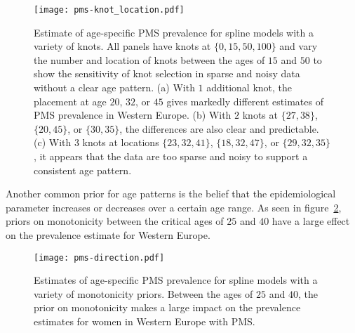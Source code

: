     \begin{figure}
        \begin{center}
            \texttt{[image: pms-knot\_location.pdf]}
        \end{center}
        \caption[Estimate of age-specific PMS prevalence for spline
          models with a variety of knots]{Estimate of age-specific PMS
          prevalence for spline models with a variety of knots.  All
          panels have knots at $\{0, 15, 50, 100\}$ and vary the number
          and location of knots between the ages of $15$ and $50$ to show
          the sensitivity of knot selection in sparse and noisy data
          without a clear age pattern. (a) With $1$ additional knot, the
          placement at age $20$, $32$, or $45$ gives markedly different
          estimates of PMS prevalence in Western Europe.  (b) With $2$
          knots at $\{27, 38\}$, $\{20, 45\}$, or $\{30, 35\}$, the
          differences are also clear and predictable. (c) With $3$ knots
          at locations $\{23, 32, 41\}$, $\{18, 32, 47\}$, or $\{29, 32,
          35\}$, it appears that the data are too sparse and noisy to
          support a consistent age pattern.}
        \label{fig:app-pms knot_loc}
    \end{figure}

Another common prior for age patterns is the belief that the
epidemiological parameter increases or decreases over a certain age
range.  As seen in figure~\ref{fig:app-pms dir}, priors on
monotonicity between the critical ages of $25$ and $40$ have a large
effect on the prevalence estimate for Western Europe.

    \begin{figure}
        \begin{center}
            \texttt{[image: pms-direction.pdf]}
        \end{center}
        \caption[Estimates of age-specific PMS prevalence for spline
          models with a variety of monotonicity priors]{Estimates of
          age-specific PMS prevalence for spline models with a variety
          of monotonicity priors. Between the ages of $25$ and $40$, the prior
          on monotonicity makes a large impact on the prevalence
          estimates for women in Western Europe with PMS.}
        \label{fig:app-pms dir}
    \end{figure}

